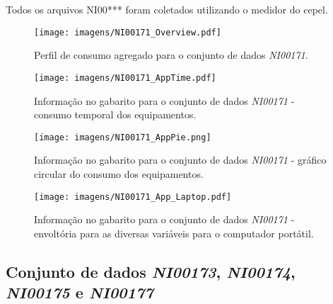 Todos os arquivos NI00*** foram coletados utilizando o medidor do
\acs{cepel}.

\begin{sidewaysfigure}[p]
\centering
\texttt{[image: imagens/NI00171\_Overview.pdf]}
\caption{Perfil de consumo agregado para o conjunto de dados
\emph{NI00171}.}
\label{fig:ni00171_overview}
\end{sidewaysfigure}

\begin{sidewaysfigure}[p]
\centering
\texttt{[image: imagens/NI00171\_AppTime.pdf]}
\caption{Informação no gabarito para o conjunto de dados
\emph{NI00171} - consumo temporal dos equipamentos.}
\label{fig:ni00171_app_time}
\end{sidewaysfigure}

\begin{sidewaysfigure}[p]
\centering
\texttt{[image: imagens/NI00171\_AppPie.png]}
\caption{Informação no gabarito para o conjunto de dados
\emph{NI00171} - gráfico circular do consumo dos equipamentos.}
\label{fig:ni00171_app_pie}
\end{sidewaysfigure}

\begin{sidewaysfigure}[p]
\centering
\texttt{[image: imagens/NI00171\_App\_Laptop.pdf]}
\caption{Informação no gabarito para o conjunto de dados
\emph{NI00171} - envoltória para as diversas variáveis para o
computador portátil.}
\label{fig:ni00171_laptop}
\end{sidewaysfigure}


\FloatBarrier
\subsection{Conjunto de dados \emph{NI00173}, \emph{NI00174},
\emph{NI00175} e \emph{NI00177}}

